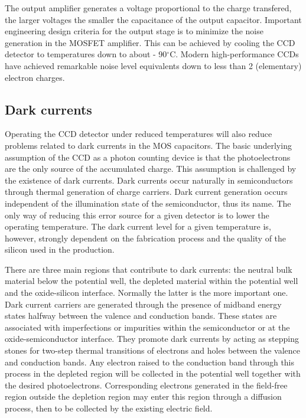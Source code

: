 The output amplifier generates a voltage proportional to the charge
transfered, the larger voltages the smaller the capacitance of the
output capacitor. Important engineering design criteria for the output
stage is to minimize the noise generation in the MOSFET
amplifier. This can be achieved by cooling the CCD detector to
temperatures down to about - 90$^\circ$C.  Modern
high-performance CCDs have achieved remarkable noise level
equivalents down to less than 2 (elementary) electron charges.

\subsection{Dark currents}

Operating the CCD detector under reduced temperatures will also reduce
problems related to dark currents in the MOS capacitors. The basic
underlying assumption of the CCD as a photon counting device is that
the photoelectrons are the only source of the accumulated charge. This
assumption is challenged by the existence of dark currents. Dark
currents occur naturally in semiconductors through thermal generation
of charge carriers. Dark current generation occurs independent of the
illumination state of the semiconductor, thus its name. The only way
of reducing this error source for a given detector is to lower the
operating temperature. The dark current level for a given temperature
is, however, strongly dependent on the fabrication process and the
quality of the silicon used in the production.

There are three main regions that contribute to dark currents: the
neutral bulk material below the potential well, the depleted material
within the potential well and the oxide-silicon interface. Normally
the latter is the more important one. Dark current carriers are
generated through the presence of midband energy states halfway
between the valence and conduction bands. These states are associated
with imperfections or impurities within the semiconductor or at the
oxide-semiconductor interface. They promote dark currents by acting as
stepping stones for two-step thermal transitions of electrons and
holes between the valence and conduction bands. Any electron raised to
the conduction band through this process in the depleted region will
be collected in the potential well together with the desired
photoelectrons. Corresponding electrons generated in the field-free
region outside the depletion region may enter this region through a
diffusion process, then to be collected by the existing electric field.
 
